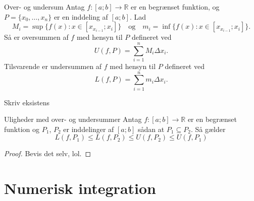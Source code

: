 \documentclass{article}
\begin{document}
\begin{definition}[colbacktitle=red!75!black]{Over- og undersum}{}
  Antag $f:[a;b] \to \mathbb{R}$ er en begrænset funktion, og $P=\{x_0,\ldots, x_n\}$ er en inddeling af $[a;b]$. 
  Lad 
  \[
  M_i=\sup \{ f(x):x \in [x _{x_{i-1}};x_i] \} \quad{\text{og}} \quad m_i=\inf \{ f(x):x \in [x _{x_{i-1}};x_i] \}.
  \] 
  Så er oversummen af $f$ med hensyn til $P$ defineret ved
  \[
  U(f,P)=\sum_{i=1}^{n} M_i \Delta x_i.
  \] 
  Tilsvarende er undersummen af $f$ med hensyn til $P$ defineret ved
  \[
  L(f,P)=\sum_{i=1}^{n} m_i \Delta x_i.
  \] 
\end{definition}
Skriv eksistens

\begin{theorem}{Uligheder med over- og undersummer}{}
  Antag $f:[a;b] \to \mathbb{R}$ er en begrænset funktion og $P_1$, $P_2$ er inddelinger af $[a;b]$ sådan at $P_1 \subseteq P_2$. Så gælder
  \[
  L(f,P_1)\leq L(f,P_2) \leq U(f,P_2) \leq U(f,P_1)
  \] 
\end{theorem}
\begin{proof} 
  Bevis det selv, lol.
\end{proof}

\section{Numerisk integration}%
\label{sec:Numerisk integration}
\end{document}

